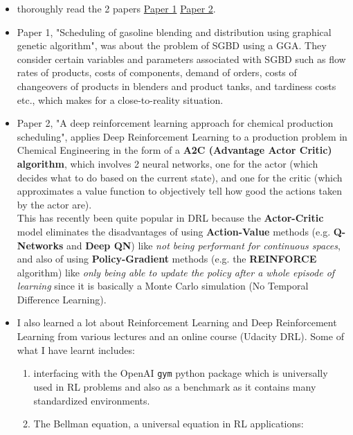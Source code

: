 \documentclass[
]{article}
\begin{document}
\begin{itemize}
\item
  thoroughly read the 2 papers
  \href{https://doi.org/10.1016/j.compchemeng.2019.106636}{Paper 1}
  \href{https://doi.org/10.1016/j.compchemeng.2020.106982}{Paper 2}.
\item
  Paper 1, "Scheduling of gasoline blending and distribution using
  graphical genetic algorithm", was about the problem of SGBD using a
  GGA. They consider certain variables and parameters associated with
  SGBD such as flow rates of products, costs of components, demand of
  orders, costs of changeovers of products in blenders and product
  tanks, and tardiness costs etc., which makes for a close-to-reality
  situation.
\item
  Paper 2, "A deep reinforcement learning approach for chemical
  production scheduling", applies Deep Reinforcement Learning to a
  production problem in Chemical Engineering in the form of a
  \textbf{A2C (Advantage Actor Critic) algorithm}, which involves 2
  neural networks, one for the actor (which decides what to do based on
  the current state), and one for the critic (which approximates a value
  function to objectively tell how good the actions taken by the actor
  are). \\
  This has recently been quite popular in DRL because the
  \textbf{Actor-Critic} model eliminates the disadvantages of using
  \textbf{Action-Value} methods (e.g. \textbf{Q-Networks} and
  \textbf{Deep QN}) like \emph{not being performant for continuous
  spaces}, and also of using \textbf{Policy-Gradient} methods (e.g. the
  \textbf{REINFORCE} algorithm) like \emph{only being able to update the
  policy after a whole episode of learning} since it is basically a
  Monte Carlo simulation (No Temporal Difference Learning).
\item
  I also learned a lot about Reinforcement Learning and Deep
  Reinforcement Learning from various lectures and an online course
  (Udacity DRL). Some of what I have learnt includes:

  \begin{enumerate}
  \def\labelenumi{\arabic{enumi}.}
  \item
    interfacing with the OpenAI \texttt{gym} python package which is
    universally used in RL problems and also as a benchmark as it
    contains many standardized environments.
  \item
    The Bellman equation, a universal equation in RL applications:
  \end{enumerate}


\end{itemize}
\end{document}
